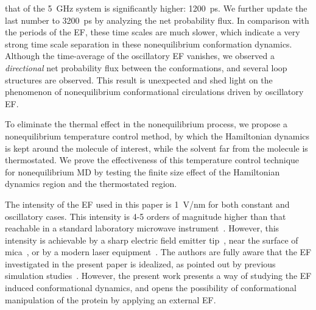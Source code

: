 \documentclass[a4paper,preprint,unsortedaddress,onecolumn]{revtex4-1}
\begin{document}
that of the 5~GHz system is significantly higher: 1200~ps.
We further update the last number to 3200~ps by analyzing the net probability flux.
In comparison with the periods of the EF, these time scales are much
slower, which indicate a very strong time scale separation
in these nonequilibrium conformation dynamics.
Although the time-average of the oscillatory EF vanishes, we observed a
\emph{directional} net probability flux between the conformations, and several
loop structures are observed. This result is unexpected and shed
light on the phenomenon of nonequilibrium conformational circulations driven
by oscillatory EF.

To eliminate the thermal effect in the nonequilibrium process, 
we propose  a nonequilibrium
temperature control method, by which the Hamiltonian dynamics is kept
around the molecule of interest, while the solvent far from the
molecule is thermostated. We prove the effectiveness of this
temperature control technique for nonequilibrium MD by testing
the finite size effect of the Hamiltonian dynamics region and the
thermostated region.

The intensity of the EF used in this paper is 1~V/nm for both constant
and oscillatory cases. This intensity is 4-5 orders of magnitude
higher than that reachable in a standard laboratory microwave
instrument~\cite{damm2012can}. However, this intensity is achievable
by a sharp electric field emitter tip~\cite{scovell2000phase}, near
the surface of mica~\cite{starzyk2013proteins}, or by a modern laser
equipment~\cite{vogel2008femtosecond}. The authors are fully aware
that the EF investigated in the present paper is idealized, as pointed
out by previous simulation studies~\cite{budi2005electric,
  budi2007effect, budi2008comparative, toschi2008effects,
  astrakas2011electric, astrakas2012structural, damm2012can,
  starzyk2013proteins, english2009nonequilibrium,
  solomentsev2012effects}. However, the present work presents a way of
studying the EF induced conformational dynamics, and opens the
possibility of conformational manipulation of the protein by applying
an external EF.
\end{document}
